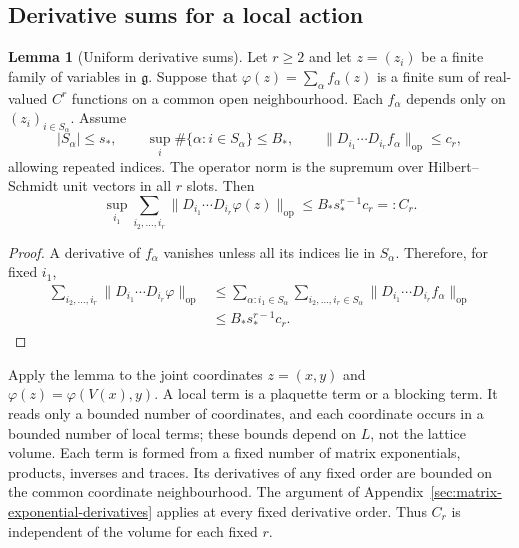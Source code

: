 \documentclass[10pt,reqno]{amsart}
\theoremstyle{definition}
\newtheorem{lemma}[definition]{Lemma}
\theoremstyle{remark}
\numberwithin{equation}{section}
\numberwithin{figure}{section}
\newcommand{\g}{\mathfrak g}
\begin{document}
\subsection{Derivative sums for a local action}
\begin{lemma}[Uniform derivative sums]\label{lem:local-derivative-sums}
Let $r\ge2$ and let $z=(z_i)$ be a finite family of variables in $\g$.
Suppose that $\varphi(z)=\sum_\alpha f_\alpha(z)$ is a finite sum of
real-valued $C^r$ functions on a common open neighbourhood. Each
$f_\alpha$ depends only on $(z_i)_{i\in S_\alpha}$. Assume
\begin{equation}\label{eq:local-derivative-sum-inputs}
|S_\alpha|\le s_*,\qquad
\sup_i\#\{\alpha:i\in S_\alpha\}\le B_*,\qquad
\|D_{i_1}\cdots D_{i_r}f_\alpha\|_{\mathrm{op}}\le c_r,
\end{equation}
allowing repeated indices. The operator norm is the supremum over
Hilbert--Schmidt unit vectors in all $r$ slots. Then
\begin{equation}\label{eq:local-derivative-row-sum}
\boxed{\sup_{i_1}\sum_{i_2,\ldots,i_r}
\|D_{i_1}\cdots D_{i_r}\varphi(z)\|_{\mathrm{op}}
\le B_*s_*^{r-1}c_r=:C_r.}
\end{equation}
\end{lemma}
\begin{proof}
A derivative of $f_\alpha$ vanishes unless all its indices lie in
$S_\alpha$. Therefore, for fixed $i_1$,
\begin{equation}\label{eq:local-derivative-row-calculation}
\begin{aligned}
\sum_{i_2,\ldots,i_r}
\|D_{i_1}\cdots D_{i_r}\varphi\|_{\mathrm{op}}
&\le\sum_{\alpha:i_1\in S_\alpha}
\sum_{i_2,\ldots,i_r\in S_\alpha}
\|D_{i_1}\cdots D_{i_r}f_\alpha\|_{\mathrm{op}}\\
&\le B_*s_*^{r-1}c_r.
\end{aligned}
\end{equation}
\end{proof}

Apply the lemma to the joint coordinates $z=(x,y)$ and
$\varphi(z)=\varphi(V(x),y)$. A local term is a plaquette term or a
blocking term. It reads only a bounded number of coordinates, and each
coordinate occurs in a bounded number of local terms; these bounds
depend on $L$, not the lattice volume. Each term is formed from a fixed
number of matrix exponentials, products, inverses and traces. Its
derivatives of any fixed order are bounded on the common coordinate
neighbourhood. The argument of Appendix~\ref{sec:matrix-exponential-derivatives}
applies at every fixed derivative order. Thus $C_r$ is independent of
the volume for each fixed $r$.
\end{document}
